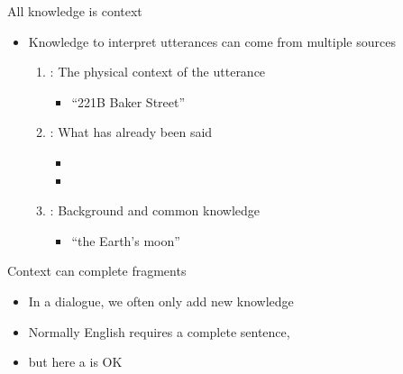 \documentclass{beamer}
\begin{document}
\begin{frame}{All knowledge is context}
\begin{itemize}\addtolength{\itemsep}{1.5ex}
\item Knowledge to interpret utterances can come from multiple sources
  \begin{enumerate}\addtolength{\itemsep}{1ex}
  \item {}: The physical context of the utterance
    \begin{itemize}
    \item {} ``221B Baker Street'' 
    \end{itemize}

  \item {}: What has already been said
    \begin{itemize}
    \item {}
    \item {} 
    \end{itemize}
  \item {}: Background and common knowledge
   \begin{itemize}
    \item {} ``the Earth's moon''
    \end{itemize}

  \end{enumerate}
\end{itemize}

\end{frame}

\begin{frame}{Context can complete fragments}
\begin{itemize}
\item In a dialogue, we often only add new knowledge
  \begin{exe}
    \ex 
    \begin{xlist}
      \ex {}
      \ex {}
  \end{xlist}
    \ex 
    \begin{xlist}
      \ex {}
      \ex {}
  \end{xlist}
  \ex
  \begin{xlist}
   \ex {}
   \ex {} \hfill {}
 \end{xlist}
\end{exe}
\item Normally English requires a complete sentence, 
\item[\ldots] but here a  is OK
\end{itemize}

\end{frame}
\end{document}
